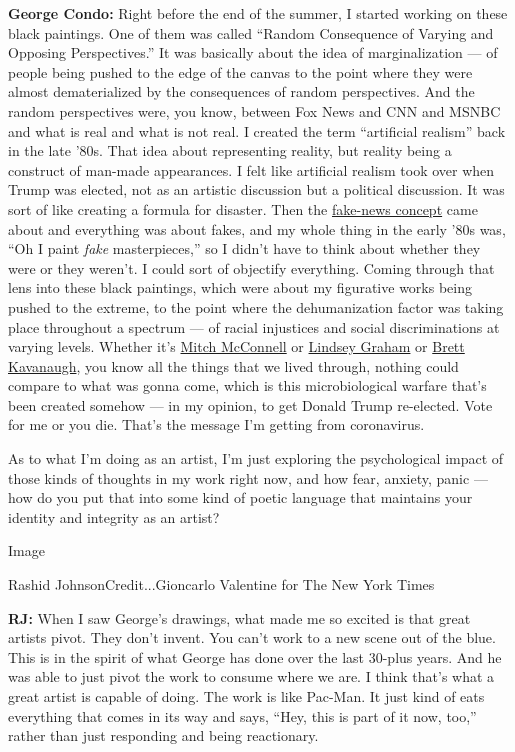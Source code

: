 \textbf{George Condo:} Right before the end of the summer, I started
working on these black paintings. One of them was called ``Random
Consequence of Varying and Opposing Perspectives.'' It was basically
about the idea of marginalization --- of people being pushed to the edge
of the canvas to the point where they were almost dematerialized by the
consequences of random perspectives. And the random perspectives were,
you know, between Fox News and CNN and MSNBC and what is real and what
is not real. I created the term ``artificial realism'' back in the late
'80s. That idea about representing reality, but reality being a
construct of man-made appearances. I felt like artificial realism took
over when Trump was elected, not as an artistic discussion but a
political discussion. It was sort of like creating a formula for
disaster. Then the
\href{https://www.nytimes3xbfgragh.onion/2017/12/12/world/europe/trump-fake-news-dictators.html}{fake-news
concept} came about and everything was about fakes, and my whole thing
in the early '80s was, ``Oh I paint \emph{fake} masterpieces,'' so I
didn't have to think about whether they were or they weren't. I could
sort of objectify everything. Coming through that lens into these black
paintings, which were about my figurative works being pushed to the
extreme, to the point where the dehumanization factor was taking place
throughout a spectrum --- of racial injustices and social
discriminations at varying levels. Whether it's
\href{https://www.nytimes3xbfgragh.onion/topic/person/mitch-mcconnell}{Mitch
McConnell} or
\href{https://www.nytimes3xbfgragh.onion/topic/person/lindsey-graham}{Lindsey
Graham} or
\href{https://www.nytimes3xbfgragh.onion/2018/09/26/us/politics/brett-kavanaugh-accusers-women.html}{Brett
Kavanaugh}, you know all the things that we lived through, nothing could
compare to what was gonna come, which is this microbiological warfare
that's been created somehow --- in my opinion, to get Donald Trump
re-elected. Vote for me or you die. That's the message I'm getting from
coronavirus.

As to what I'm doing as an artist, I'm just exploring the psychological
impact of those kinds of thoughts in my work right now, and how fear,
anxiety, panic --- how do you put that into some kind of poetic language
that maintains your identity and integrity as an artist?

Image

Rashid JohnsonCredit...Gioncarlo Valentine for The New York Times

\textbf{RJ:} When I saw George's drawings, what made me so excited is
that great artists pivot. They don't invent. You can't work to a new
scene out of the blue. This is in the spirit of what George has done
over the last 30-plus years. And he was able to just pivot the work to
consume where we are. I think that's what a great artist is capable of
doing. The work is like Pac-Man. It just kind of eats everything that
comes in its way and says, ``Hey, this is part of it now, too,'' rather
than just responding and being reactionary.

